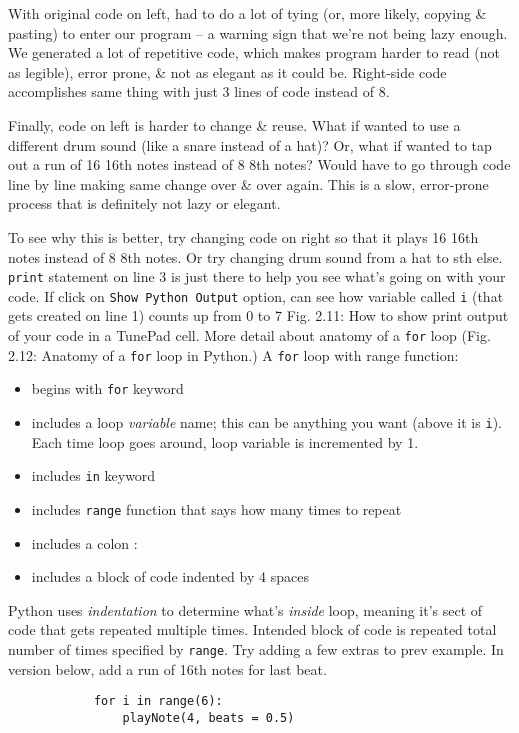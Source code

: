 \documentclass{article}
\begin{document}
\begin{itemize}
\begin{itemize}
		With original code on left, had to do a lot of tying (or, more likely, copying \& pasting) to enter our program -- a warning sign that we're not being lazy enough. We generated a lot of repetitive code, which makes program harder to read (not as legible), error prone, \& not as elegant as it could be. Right-side code accomplishes same thing with just 3 lines of code instead of 8.
		
		Finally, code on left is harder to change \& reuse. What if wanted to use a different drum sound (like a snare instead of a hat)? Or, what if wanted to tap out a run of 16 16th notes instead of 8 8th notes? Would have to go through code line by line making same change over \& over again. This is a slow, error-prone process that is definitely not lazy or elegant.
		
		To see why this is better, try changing code on right so that it plays 16 16th notes instead of 8 8th notes. Or try changing drum sound from a hat to sth else. {\tt print} statement on line 3 is just there to help you see what's going on with your code. If click on {\tt Show Python Output} option, can see how variable called {\tt i} (that gets created on line 1) counts up from 0 to 7 {\sf Fig. 2.11: How to show print output of your code in a TunePad cell.} More detail about anatomy of a {\tt for} loop ({\sf Fig. 2.12: Anatomy of a {\tt for} loop in Python.}) A {\tt for} loop with range function:
		\begin{itemize}
			\item begins with {\tt for} keyword
			\item includes a loop {\it variable} name; this can be anything you want (above it is {\tt i}). Each time loop goes around, loop variable is incremented by 1.
			\item includes {\tt in} keyword
			\item includes {\tt range} function that says how many times to repeat
			\item includes a colon :
			\item includes a block of code indented by 4 spaces
		\end{itemize}
		Python uses {\it indentation} to determine what's {\it inside} loop, meaning it's sect of code that gets repeated multiple times. Intended block of code is repeated total number of times specified by {\tt range}. Try adding a few extras to prev example. In version below, add a run of 16th notes for last beat.
		\begin{verbatim}
			for i in range(6):
			    playNote(4, beats = 0.5)

\end{verbatim}
\end{itemize}
\end{itemize}
\end{document}
